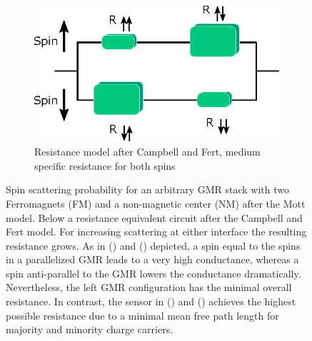 \begin{figure}[t]
\begin{subfigure}[l]{0.49\linewidth}
		\label{fig:nano:R:parallel}
	\end{subfigure}
	\hfill
	\begin{subfigure}[r]{0.49\linewidth} 
		\centering
		\includegraphics[clip,trim={0mm 0mm 0mm 0mm},scale=.6]{Ressourcen/IMG/Spin-valve-Ranti.eps}
		\caption{Resistance model after Campbell and Fert, medium specific resistance for both spins}
		\label{fig:nano:R:anti}
	\end{subfigure}
	\caption{Spin scattering probability for an arbitrary GMR stack with two Ferromagnets (FM) and a non-magnetic center (NM) after the Mott model. Below a resistance equivalent circuit after the Campbell and Fert model. For increasing scattering at either interface the resulting resistance grows. As in (\protect{}) and (\protect{}) depicted, a spin equal to the spins in a parallelized GMR leads to a very high conductance, whereas a spin anti-parallel to the GMR lowers the conductance dramatically. Nevertheless, the left GMR configuration has the minimal overall resistance. In contrast, the sensor in (\protect{}) and (\protect{}) achieves the highest possible resistance due to a minimal mean free path length for majority and minority charge carriers.}
	\label{fig:nano:GMR}
\end{figure}


